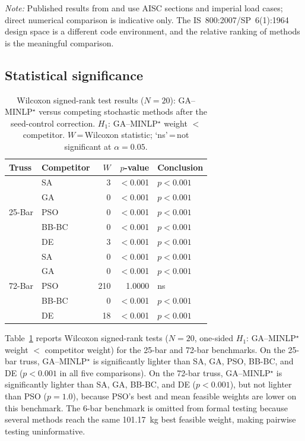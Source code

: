 \documentclass[lineno,pdflatex,sn-mathphys-num]{sn-jnl}
\begin{document}
\noindent
\textit{Note:} Published results from \citet{Camp2004} and
\citet{Camp2007} use AISC sections and imperial load cases;
direct numerical comparison is indicative only.
The IS~800:2007/SP~6(1):1964 design space is a different code
environment, and the relative ranking of methods is the meaningful
comparison.

\subsection{Statistical significance}
\label{sec:stats}


\begin{table}[tbp]\centering
\caption{Wilcoxon signed-rank test results ($N=20$): GA--MINLP$^\star$ versus competing stochastic methods after the seed-control correction. $H_1$: GA--MINLP$^\star$ weight $<$ competitor. $W$\,=\,Wilcoxon statistic; `ns'\,=\,not significant at $\alpha=0.05$.}
\label{tab:wilcoxon}
\begin{tabular}{@{}llrrl@{}}\toprule
\textbf{Truss} & \textbf{Competitor} & $W$ & $p$-value & \textbf{Conclusion} \\
\midrule
\multirow{5}{*}{25-Bar} & SA & 3 & $<$0.001 & $p<0.001$ \\
 & GA & 0 & $<$0.001 & $p<0.001$ \\
 & PSO & 0 & $<$0.001 & $p<0.001$ \\
 & BB-BC & 0 & $<$0.001 & $p<0.001$ \\
 & DE & 3 & $<$0.001 & $p<0.001$ \\
\midrule
\multirow{5}{*}{72-Bar} & SA & 0 & $<$0.001 & $p<0.001$ \\
 & GA & 0 & $<$0.001 & $p<0.001$ \\
 & PSO & 210 & 1.0000 & ns \\
 & BB-BC & 0 & $<$0.001 & $p<0.001$ \\
 & DE & 18 & $<$0.001 & $p<0.001$ \\
\bottomrule\end{tabular}\end{table}


\noindent
Table~\ref{tab:wilcoxon} reports Wilcoxon signed-rank tests
($N=20$, one-sided $H_1$: GA--MINLP$^\star$ weight $<$ competitor weight)
for the 25-bar and 72-bar benchmarks.
On the 25-bar truss, GA--MINLP$^\star$ is significantly lighter than
SA, GA, PSO, BB-BC, and DE ($p<0.001$ in all five comparisons).
On the 72-bar truss, GA--MINLP$^\star$ is significantly lighter than
SA, GA, BB-BC, and DE ($p<0.001$), but not lighter than PSO
($p=1.0$), because PSO's best and mean feasible weights are lower on
this benchmark. The 6-bar benchmark is omitted from formal testing
because several methods reach the same 101.17~kg best feasible weight,
making pairwise testing uninformative.
\end{document}
